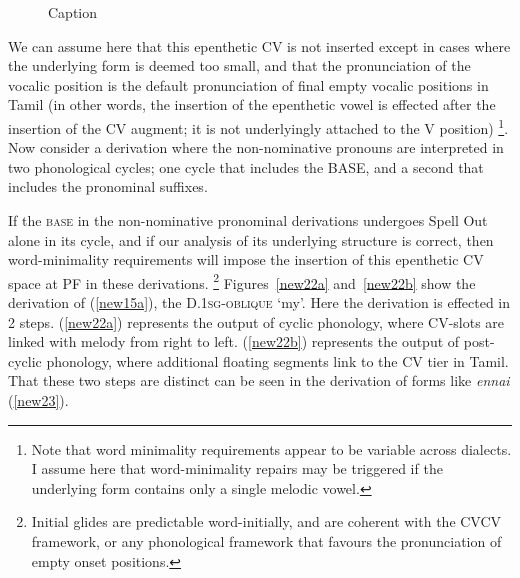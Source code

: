 \documentclass[output=paper,colorlinks,citecolor=brown,
]{langscibook}
\begin{document}
\begin{figure}
\begin{minipage}{.25\textwidth}
    \end{minipage}
    \caption{Caption}
    \label{new21}
\end{figure}

We can assume here that this epenthetic CV is not inserted except in cases where the underlying form is deemed too small, and that the pronunciation of the vocalic position is the default pronunciation of final empty vocalic positions in Tamil (in other words, the insertion of the epenthetic vowel is effected after the insertion of the CV augment; it is not underlyingly attached to the V position) \footnote{Note that word minimality requirements appear to be variable across dialects. I assume here that word-minimality repairs may be triggered if the underlying form contains only a single melodic vowel.}.  Now consider a derivation where the non-nominative pronouns are interpreted in two phonological cycles; one cycle that includes the BASE, and a second that includes the pronominal suffixes. 

If the \textsc{base} in the non-nominative pronominal derivations undergoes Spell Out alone in its cycle, and if our analysis of its underlying structure is correct, then word-minimality requirements will impose the insertion of this epenthetic CV space at PF in these derivations.%
    \footnote{Initial glides are predictable word-initially, and are coherent with the CVCV framework, or any phonological framework that favours the pronunciation of empty onset positions.} 
Figures~\ref{new22a} and~\ref{new22b} show the derivation of (\ref{new15a}), the D.1\textsc{sg-oblique} ‘my’. Here the derivation is effected in 2 steps. (\ref{new22a}) represents the output of cyclic phonology, where CV-slots are linked with melody from right to left. (\ref{new22b}) represents the output of post-cyclic phonology, where additional floating segments link to the CV tier in Tamil. That these two steps are distinct can be seen in the derivation of forms like \textit{ennai} (\ref{new23}).
\end{document}
